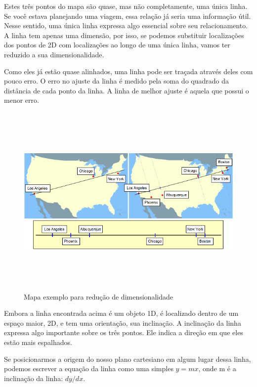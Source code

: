 Estes três pontos do mapa são quase, mas não completamente, uma única linha. Se você estava planejando uma viagem, essa relação já seria uma informação útil. Nesse sentido, uma única linha expressa algo essencial sobre seu relacionamento. A linha tem apenas uma dimensão, por isso, se podemos substituir localizações dos pontos de 2D com localizações ao longo de uma única linha, vamos ter reduzido a sua dimensionalidade.

Como eles já estão quase alinhados, uma linha pode ser traçada através deles com pouco erro. O erro no ajuste da linha é medido pela soma do quadrado da distância de cada ponto da linha. A linha de melhor ajuste é aquela que possui o menor erro.

	\begin{figure}[hbt]
		\begin{center}
			\includegraphics[height=9.5cm,width=12.5cm]{figuras/2.FundamentacaoTeorica/PCAexemploMapa.png}
		\end{center}
		\caption{Mapa exemplo para redução de dimensionalidade}
		\label{exemploPCA}
	\end{figure}

Embora a linha encontrada acima é um objeto 1D, é localizado dentro de um espaço maior, 2D, e tem uma orientação, sua inclinação. A inclinação da linha expressa algo importante sobre os três pontos. Ele indica a direção em que eles estão mais espalhados.


Se posicionarmos a origem do nosso plano cartesiano em algum lugar dessa linha, podemos escrever a equação da linha como uma simples $y = mx$, onde m é a inclinação da linha: $dy / dx$.

